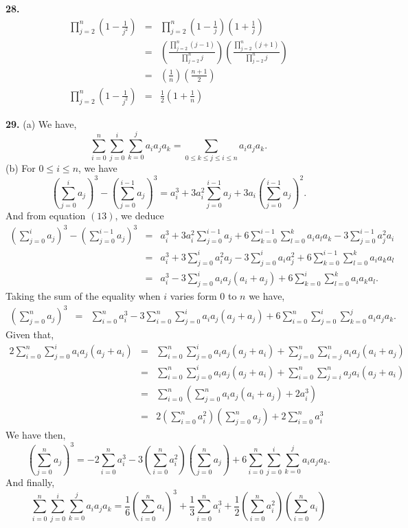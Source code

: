 \documentclass[a4paper,12pt]{article}
\newcommand{\newpar}[1]{\bigskip \noindent \textbf{#1.}}
\begin{document}
\newpar{28}
\begin{eqnarray*}
\prod_{j=2}^n\left(1 - \frac{1}{j^2}\right) &=&
\prod_{j=2}^n\left(1 - \frac{1}{j}\right)
\left(1 + \frac{1}{j}\right)\\ &=&
\left(\frac{\prod_{j=2}^n(j-1)}{\prod_{j=2}^nj}\right)
\left(\frac{\prod_{j=2}^n(j+1)}{\prod_{j=2}^nj}\right)\\ &=&
\left(\frac{1}{n}\right)\left(\frac{n+1}{2}\right)\\
\prod_{j=2}^n\left(1 - \frac{1}{j^2}\right) &=&
\frac{1}{2}\left(1 + \frac{1}{n}\right)
\end{eqnarray*}

\newpar{29} (a) We have,
\[ \sum_{i=0}^n\sum_{j=0}^i\sum_{k=0}^ja_ia_ja_k =
\sum_{0 \le k \le j \le i \le n} a_ia_ja_k.\]
\noindent
(b) For $0 \le i \le n$, we have
\[ \left(\sum_{j=0}^ia_j\right)^3 -
\left(\sum_{j=0}^{i-1}a_j\right)^3 =
a_i^3 + 3a_i^2\sum_{j=0}^{i-1}a_j+
3a_i\left(\sum_{j=0}^{i-1}a_j\right)^2.
\]
And from equation $(13)$, we deduce
\begin{eqnarray*}
\left(\sum_{j=0}^ia_j\right)^3 -
\left(\sum_{j=0}^{i-1}a_j\right)^3 &=&
a_i^3+3a_i^2\sum_{j=0}^{i-1}a_j +
6 \sum_{k=0}^{i-1}\sum_{l=0}^ka_ia_la_k-
3\sum_{j=0}^{i-1}a_j^2a_i\\&=&
a_i^3+3\sum_{j=0}^ia_i^2a_j - 3 \sum_{j=0}^ia_ia_j^2+
6\sum_{k=0}^{i-1}\sum_{l=0}^ka_ia_ka_l\\&=&
a_i^3 - 3\sum_{j=0}^ia_ia_j(a_i+a_j) +
6\sum_{k=0}^i\sum_{l=0}^ka_ia_ka_l.
\end{eqnarray*}
Taking the sum of the equality when $i$ varies form $0$ to $n$ we
have,
\begin{eqnarray*}
\left(\sum_{j=0}^na_j\right)^3 &=& \sum_{i=0}^na_i^3 -
3 \sum_{i=0}^n\sum_{j=0}^ia_ia_j(a_j+a_j) +
6 \sum_{i=0}^n\sum_{j=0}^i\sum_{k=0}^ja_ia_ja_k.
\end{eqnarray*}
Given that,
\begin{eqnarray*}
2\sum_{i=0}^n\sum_{j=0}^ia_ia_j(a_j+a_i) &=&
\sum_{i=0}^n\sum_{j=0}^ia_ia_j(a_j+a_i) +
\sum_{j=0}^n\sum_{i=j}^na_ia_j(a_i+a_j)\\ &=&
\sum_{i=0}^n\sum_{j=0}^ia_ia_j(a_j+a_i) +
\sum_{i=0}^n\sum_{j=i}^na_ja_i(a_j+a_i)\\ &=&
\sum_{i=0}^n\left(\sum_{j=0}^na_ia_j(a_i+a_j) + 2a_i^3\right)\\ &=&
2\left(\sum_{i=0}^na_i^2\right)\left(\sum_{j=0}^na_j\right)+
2\sum_{i=0}^na_i^3
\end{eqnarray*}
We have then,
\[\left(\sum_{j=0}^na_j\right)^3 = -2\sum_{i=0}^na_i^3 -
3\left(\sum_{i=0}^na_i^2\right)\left(\sum_{j=0}^na_j\right) +
6\sum_{i=0}^n\sum_{j=0}^i\sum_{k=0}^ja_ia_ja_k.\]
And finally,
\[\sum_{i=0}^n\sum_{j=0}^i\sum_{k=0}^ja_ia_ja_k =
\frac{1}{6}\left(\sum_{i=0}^na_i\right)^3 +
\frac{1}{3}\sum_{i=0}^na_i^3 + 
\frac{1}{2}\left(\sum_{i=0}^na_i^2\right)\left(\sum_{i=0}^na_i\right)\]
\end{document}
